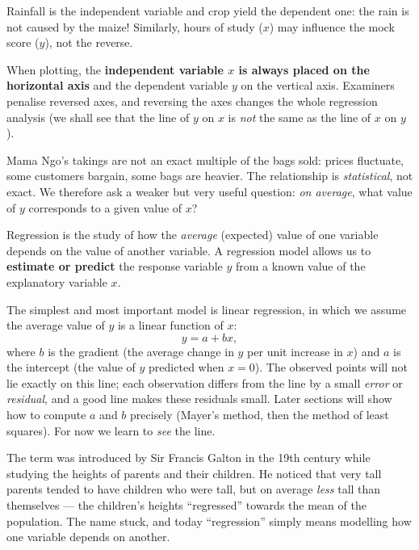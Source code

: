 \documentclass[11pt]{article}
\newcommand{\cle}[1]{{\popxbold\color{popdark}#1}}
\newcounter{popsec}
\newcounter{popsub}
\newcommand{\courssub}[1]{%
  \stepcounter{popsub}%
  \par\vspace{9pt}\noindent{\popxbold\fontsize{11.5}{13}\selectfont\color{popink}{\color{poporange}\thepopsec.\thepopsub}\hspace{6pt}#1}\par\nopagebreak\vspace{4pt}
}
\begin{document}
Rainfall is the independent variable and crop yield the dependent one: the rain is not caused by the maize! Similarly, hours of study ($x$) may influence the mock score ($y$), not the reverse.

\begin{attention}
When plotting, the \textbf{independent variable $x$ is always placed on the horizontal axis} and the dependent variable $y$ on the vertical axis. Examiners penalise reversed axes, and reversing the axes changes the whole regression analysis (we shall see that the line of $y$ on $x$ is \emph{not} the same as the line of $x$ on $y$).
\end{attention}

\courssub{The Idea of Regression}

Mama Ngo's takings are not an exact multiple of the bags sold: prices fluctuate, some customers bargain, some bags are heavier. The relationship is \emph{statistical}, not exact. We therefore ask a weaker but very useful question: \emph{on average}, what value of $y$ corresponds to a given value of $x$?

\begin{definition}[Regression]
\cle{Regression} is the study of how the \emph{average} (expected) value of one variable depends on the value of another variable. A regression model allows us to \textbf{estimate or predict} the response variable $y$ from a known value of the explanatory variable $x$.
\end{definition}

The simplest and most important model is \cle{linear regression}, in which we assume the average value of $y$ is a linear function of $x$:
\[
y = a + bx,
\]
where $b$ is the \cle{gradient} (the average change in $y$ per unit increase in $x$) and $a$ is the \cle{intercept} (the value of $y$ predicted when $x = 0$). The observed points will not lie exactly on this line; each observation differs from the line by a small \emph{error} or \emph{residual}, and a good line makes these residuals small. Later sections will show how to compute $a$ and $b$ precisely (Mayer's method, then the method of least squares). For now we learn to \emph{see} the line.

\begin{savaistu}
The term was introduced by Sir Francis Galton in the 19th century while studying the heights of parents and their children. He noticed that very tall parents tended to have children who were tall, but on average \emph{less} tall than themselves --- the children's heights ``regressed'' towards the mean of the population. The name stuck, and today ``regression'' simply means modelling how one variable depends on another.
\end{savaistu}
\end{document}
